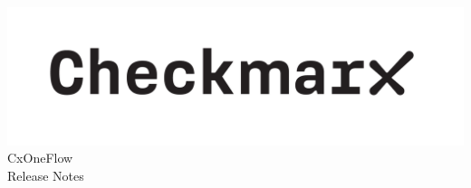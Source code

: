 \documentclass[a4paper, 11pt, oneside]{book}
\begin{document}
\begin{center}
    \includegraphics[scale=.5]{../manual/graphics/logo.jpg}
    \Huge{CxOneFlow\\Release Notes}
\end{center}



\end{document}
